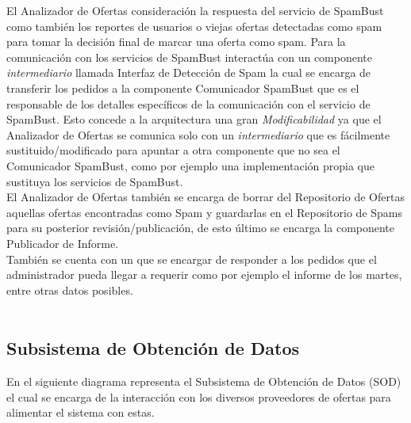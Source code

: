 El \textsf{Analizador de Ofertas} consideración la respuesta del servicio de \textsf{SpamBust} como también los reportes de usuarios o viejas ofertas detectadas como spam para tomar la decisión final de marcar una oferta como spam. Para la comunicación con los servicios de \textsf{SpamBust} interactúa con un componente \emph{intermediario} llamada \textsf{Interfaz de Detección de Spam} la cual se encarga de transferir los pedidos a la componente \textsf{Comunicador SpamBust} que es el responsable de los detalles específicos de la comunicación con el servicio de \textsf{SpamBust}. Esto concede a la arquitectura una gran \emph{Modificabilidad} ya que el \textsf{Analizador de Ofertas} se comunica solo con un \emph{intermediario} que es fácilmente sustituido/modificado para apuntar a otra componente que no sea el \textsf{Comunicador SpamBust}, como por ejemplo una implementación propia que sustituya los servicios de \textsf{SpamBust}.\\

El \textsf{Analizador de Ofertas} también se encarga de borrar del \textsf{Repositorio de Ofertas} aquellas ofertas encontradas como Spam y guardarlas en el \textsf{Repositorio de Spams} para su posterior revisión/publicación, de esto último se encarga la componente \textsf{Publicador de Informe}.\\

También se cuenta con un  que se encargar de responder a los pedidos que el administrador pueda llegar a requerir como por ejemplo el informe de los martes, entre otras datos posibles.\\


\\
\subsection{Subsistema de Obtención de Datos}


En el siguiente diagrama representa el Subsistema de Obtención de Datos (\textsf{SOD}) el cual se encarga de la interacción con los diversos proveedores de ofertas para alimentar el sistema con estas.\\

